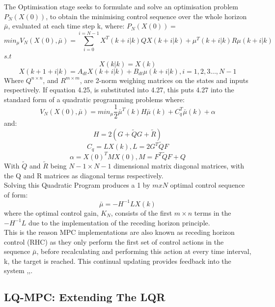 \documentclass[12pt,a4paper,twoside]{report}
\begin{document}
				\space
				The Optimisation stage seeks to formulate and solve an optimisation problem \(P_N(X(0))\), to obtain the minimising control sequence over the whole horizon $\bar{\mu}$, evaluated at each time step k, where:
				\(P_N(X(0)) = \)				
				\begin{equation}
					min_\mu  V_N(X(0),\bar{\mu}) = \sum_{i = 0}^{i = N-1} X^{T}(k+i|k) Q X(k+i|k) + \mu^{T}(k+i|k) R \mu(k+i|k)
				\end{equation}
				\(s.t\)
				\[
					X(k|k) = X(k)
				\]
				\[
					X(k+1+i|k) = A_{dt}X(k+i|k) + B_{dt} \mu(k+i|k) , i=1,2,3\dots,N-1
				\]
				Where $Q^{n \times n}$, and $R^{m \times m}$, are 2-norm weighing matrices on the states and inputs respectively. If equation 4.25, is substituted into 4.27, this puts 4.27 into the standard form of a quadratic programming problems where:
				\begin{equation}
					V_N(X(0),\bar{\mu}) = min_\mu \frac{1}{2} \bar{\mu}^{T}(k) H \bar{\mu}(k) + C_q^{T}\bar{\mu}(k) + \alpha
				\end{equation}
				and:
					\[H = 2(G + \tilde{Q}G + \tilde{R})\]
					\[C_q = L X(k) , L = 2 G^{T} \tilde{Q} F\]
				\begin{equation}
					\alpha = X(0)^{T} M X(0), M = F^{T} \tilde{Q} F + Q
				\end{equation}
				With \( \tilde{Q} \) and \(\tilde{R}\) being \(N-1 \times N-1\) dimensional matrix diagonal matrices, with the Q and R matrices as diagonal terms respectively.
				\\
				Solving this Quadratic Program produces a 1 by $mxN$ optimal control sequence of form:
				\begin{equation}
					\bar{\mu }= -H^{-1} L X(k)
				\end{equation}
				where the optimal control gain, $K_N$, consists of the first $m \times n$ terms in the $-H^{-1} L$ due to the implementation of the receding horizon principle. 
				\\
				This is the reason MPC implementations are also known as receding horizon control (RHC) as they only perform the first set of control actions in the sequence $\bar{\mu}$, before recalculating and performing this action at every time interval, k, the target is reached. This continual updating provides feedback into the system \cite{25},\cite{26},\cite{27}. 
				
			\subsection{LQ-MPC: Extending The LQR}
				
\end{document}
